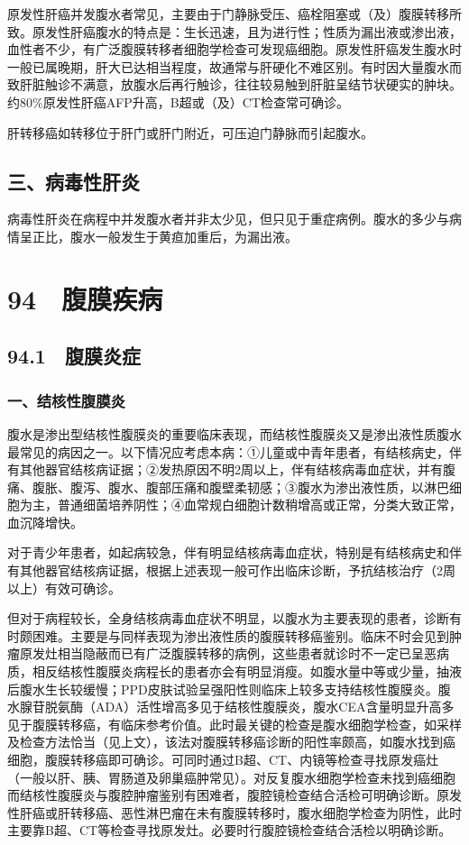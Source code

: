 原发性肝癌并发腹水者常见，主要由于门静脉受压、癌栓阻塞或（及）腹膜转移所致。原发性肝癌腹水的特点是：生长迅速，且为进行性；性质为漏出液或渗出液，血性者不少，有广泛腹膜转移者细胞学检查可发现癌细胞。原发性肝癌发生腹水时一般已属晚期，肝大已达相当程度，故通常与肝硬化不难区别。有时因大量腹水而致肝脏触诊不满意，放腹水后再行触诊，往往较易触到肝脏呈结节状硬实的肿块。约80\%原发性肝癌AFP升高，B超或（及）CT检查常可确诊。

肝转移癌如转移位于肝门或肝门附近，可压迫门静脉而引起腹水。

\subsection{三、病毒性肝炎}

病毒性肝炎在病程中并发腹水者并非太少见，但只见于重症病例。腹水的多少与病情呈正比，腹水一般发生于黄疸加重后，为漏出液。

\protect\hypertarget{text00222.html}{}{}

\section{94　腹膜疾病}

\subsection{94.1　腹膜炎症}

\subsubsection{一、结核性腹膜炎}

腹水是渗出型结核性腹膜炎的重要临床表现，而结核性腹膜炎又是渗出液性质腹水最常见的病因之一。以下情况应考虑本病：①儿童或中青年患者，有结核病史，伴有其他器官结核病证据；②发热原因不明2周以上，伴有结核病毒血症状，并有腹痛、腹胀、腹泻、腹水、腹部压痛和腹壁柔韧感；③腹水为渗出液性质，以淋巴细胞为主，普通细菌培养阴性；④血常规白细胞计数稍增高或正常，分类大致正常，血沉降增快。

对于青少年患者，如起病较急，伴有明显结核病毒血症状，特别是有结核病史和伴有其他器官结核病证据，根据上述表现一般可作出临床诊断，予抗结核治疗（2周以上）有效可确诊。

但对于病程较长，全身结核病毒血症状不明显，以腹水为主要表现的患者，诊断有时颇困难。主要是与同样表现为渗出液性质的腹膜转移癌鉴别。临床不时会见到肿瘤原发灶相当隐蔽而已有广泛腹膜转移的病例，这些患者就诊时不一定已呈恶病质，相反结核性腹膜炎病程长的患者亦会有明显消瘦。如腹水量中等或少量，抽液后腹水生长较缓慢；PPD皮肤试验呈强阳性则临床上较多支持结核性腹膜炎。腹水腺苷脱氨酶（ADA）活性增高多见于结核性腹膜炎，腹水CEA含量明显升高多见于腹膜转移癌，有临床参考价值。此时最关键的检查是腹水细胞学检查，如采样及检查方法恰当（见上文），该法对腹膜转移癌诊断的阳性率颇高，如腹水找到癌细胞，腹膜转移癌即可确诊。可同时通过B超、CT、内镜等检查寻找原发癌灶（一般以肝、胰、胃肠道及卵巢癌肿常见）。对反复腹水细胞学检查未找到癌细胞而结核性腹膜炎与腹腔肿瘤鉴别有困难者，腹腔镜检查结合活检可明确诊断。原发性肝癌或肝转移癌、恶性淋巴瘤在未有腹膜转移时，腹水细胞学检查为阴性，此时主要靠B超、CT等检查寻找原发灶。必要时行腹腔镜检查结合活检以明确诊断。


